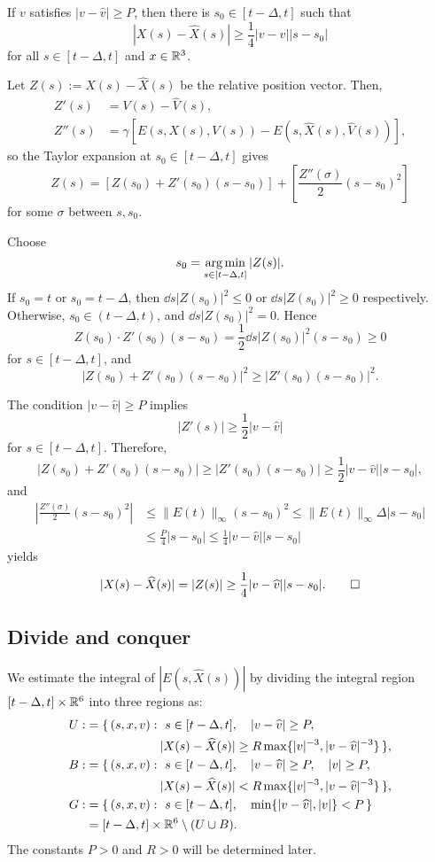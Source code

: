 \documentclass[11pt]{amsart}
\begin{document}
\begin{lem}
If $v$ satisfies $|v-\hat v|\ge P$, then there is $s_0\in[t-\Delta,t]$ such that
\[|X(s)-\hat X(s)|\ge\frac14|v-\hat v||s-s_0|\]
for all $s\in[t-\Delta,t]$ and $x\in\R^3$.
\end{lem}
\begin{pf}
Let $Z(s):=X(s)-\hat X(s)$ be the relative position vector.
Then,
\begin{align*}
Z'(s)&=V(s)-\hat V(s),\\
Z''(s)&=\gamma[E(s,X(s),V(s))-E(s,\hat X(s),\hat V(s))],
\end{align*}
so the Taylor expansion at $s_0\in[t-\Delta,t]$ gives
\[Z(s)=\left[Z(s_0)+Z'(s_0)(s-s_0)\right]+\left[\frac{Z''(\sigma)}2(s-s_0)^2\right]\]
for some $\sigma$ between $s,s_0$.

Choose
\[s_0=\argmin_{s\in[t-\Delta,t]}|Z(s)|.\]
If $s_0=t$ or $s_0=t-\Delta$, then $\dd{s}|Z(s_0)|^2\le0$ or $\dd{s}|Z(s_0)|^2\ge0$ respectively.
Otherwise, $s_0\in(t-\Delta,t)$, and $\dd{s}|Z(s_0)|^2=0$.
Hence
\[Z(s_0)\cdot Z'(s_0)(s-s_0)=\frac12\dd{s}|Z(s_0)|^2(s-s_0)\ge0\]
for $s\in[t-\Delta,t]$, and
\[|Z(s_0)+Z'(s_0)(s-s_0)|^2\ge|Z'(s_0)(s-s_0)|^2.\]

The condition $|v-\hat v|\ge P$ implies
\[|Z'(s)|\ge\frac12|v-\hat v|\]
for $s\in[t-\Delta,t]$.
Therefore,
\[|Z(s_0)+Z'(s_0)(s-s_0)|\ge|Z'(s_0)(s-s_0)|\ge\frac12|v-\hat v||s-s_0|,\]
and
\begin{align*}
|\frac{Z''(\sigma)}2(s-s_0)^2|
&\le\|E(t)\|_\infty(s-s_0)^2
\le\|E(t)\|_\infty\Delta|s-s_0|\\
&\le\frac P4|s-s_0|
\le\frac14|v-\hat v||s-s_0|
\end{align*}
yields
\[|X(s)-\hat X(s)|=|Z(s)|\ge\frac14|v-\hat v||s-s_0|.\qedhere\]
\end{pf}


\subsection{Divide and conquer}

We estimate the integral of $|E(s,\hat X(s))|$ by dividing the integral region $[t-\Delta,t]\times\R^6$ into three regions as:
\begin{align*}
U:&=\{\,(s,x,v):\ s\in[t-\Delta,t],\quad|v-\hat v|\ge P,\\
&\hspace{6em}|X(s)-\hat X(s)|\ge R\max\{|v|^{-3},|v-\hat v|^{-3}\}\,\},\\
B:&=\{\,(s,x,v):\ s\in[t-\Delta,t],\quad|v-\hat v|\ge P,\quad|v|\ge P,\\
&\hspace{6em}|X(s)-\hat X(s)|<R\max\{|v|^{-3},|v-\hat v|^{-3}\}\,\},\\
G:&=\{\,(s,x,v):\ s\in[t-\Delta,t],\quad\min\{|v-\hat v|,|v|\}<P\,\}\\
&=[t-\Delta,t]\times\R^6\setminus(U\cup B).
\end{align*}
The constants $P>0$ and $R>0$ will be determined later.
\end{document}

